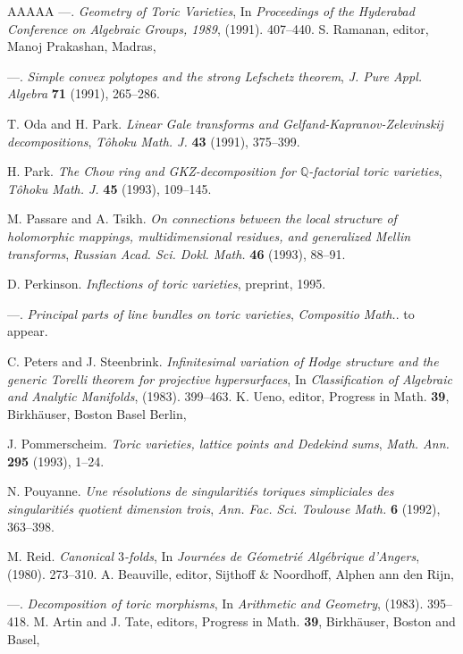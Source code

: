 \documentclass{amsart}
\theoremstyle{plain}
\theoremstyle{definition}
\begin{document}
\begin{thebibliography}{AAAAA}
---. \textit{Geometry of Toric Varieties}, In \textit{Proceedings of the Hyderabad Conference on Algebraic Groups, 1989}, (1991). 407--440. S. Ramanan, editor, Manoj Prakashan, Madras,

---. \textit{Simple convex polytopes and the strong Lefschetz theorem}, \textit{J. Pure Appl. Algebra} \textbf{71} (1991), 265--286.

T. Oda and H. Park. \textit{Linear Gale transforms and Gelfand-Kapranov-Zelevinskij decompositions}, \textit{T\^ ohoku Math. J.} \textbf{43} (1991), 375--399.

H. Park. \textit{The Chow ring and GKZ-decomposition for ${\mathbb Q}$-factorial toric varieties}, \textit{T\^ ohoku Math. J.} \textbf{45} (1993), 109--145.

M. Passare and A. Tsikh. \textit{On connections between the local structure of holomorphic mappings, multidimensional residues, and generalized Mellin transforms}, \textit{Russian Acad. Sci. Dokl. Math.} \textbf{46} (1993), 88--91.

D. Perkinson. \textit{Inflections of toric varieties}, preprint, 1995.

---. \textit{Principal parts of line bundles on toric varieties}, \textit{Compositio Math.}. to appear.

C. Peters and J. Steenbrink. \textit{Infinitesimal variation of Hodge structure and the generic Torelli theorem for projective hypersurfaces}, In \textit{Classification of Algebraic and Analytic Manifolds}, (1983). 399--463. K. Ueno, editor, Progress in Math. \textbf{39}, Birkh\"auser, Boston Basel Berlin,

J. Pommerscheim. \textit{Toric varieties, lattice points and Dedekind sums}, \textit{Math. Ann.} \textbf{295} (1993), 1--24.

N. Pouyanne. \textit{Une r\'esolutions de singulariti\'es toriques simpliciales des singulariti\'es quotient dimension trois}, \textit{Ann. Fac. Sci. Toulouse Math.} \textbf{6} (1992), 363--398.

M. Reid. \textit{Canonical $3$-folds}, In \textit{Journ\'ees de G\'eometri\'e Alg\'ebrique d'Angers}, (1980). 273--310. A. Beauville, editor, Sijthoff \& Noordhoff, Alphen ann den Rijn,

---. \textit{Decomposition of toric morphisms}, In \textit{Arithmetic and Geometry}, (1983). 395--418. M. Artin and J. Tate, editors, Progress in Math. \textbf{39}, Birkh\"auser, Boston and Basel,


\end{thebibliography}
\end{document}
